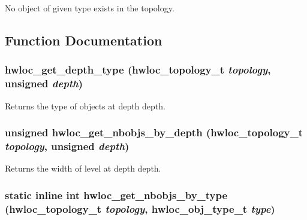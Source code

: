 No object of given type exists in the topology. 

\subsection{Function Documentation}
\hypertarget{group__hwlocality__information_ga8cc04ad9eb03b0b74d420adf8cc11ad2}{
\subsubsection[{hwloc\_\-get\_\-depth\_\-type}]{ hwloc\_\-get\_\-depth\_\-type ({\bf hwloc\_\-topology\_\-t} {\em topology}, \/  unsigned {\em depth})}}
\label{group__hwlocality__information_ga8cc04ad9eb03b0b74d420adf8cc11ad2}


Returns the type of objects at depth {\ttfamily depth}. \hypertarget{group__hwlocality__information_gab17065e3d53455973844568d9f21c72c}{
\subsubsection[{hwloc\_\-get\_\-nbobjs\_\-by\_\-depth}]{\setlength{\rightskip}{0pt plus 5cm}unsigned hwloc\_\-get\_\-nbobjs\_\-by\_\-depth ({\bf hwloc\_\-topology\_\-t} {\em topology}, \/  unsigned {\em depth})}}
\label{group__hwlocality__information_gab17065e3d53455973844568d9f21c72c}


Returns the width of level at depth {\ttfamily depth}. \hypertarget{group__hwlocality__information_gad86a90c0d3501d90410fb1a4eb36f5d0}{
\subsubsection[{hwloc\_\-get\_\-nbobjs\_\-by\_\-type}]{\setlength{\rightskip}{0pt plus 5cm}static inline int hwloc\_\-get\_\-nbobjs\_\-by\_\-type ({\bf hwloc\_\-topology\_\-t} {\em topology}, \/  {\bf hwloc\_\-obj\_\-type\_\-t} {\em type})}}
\label{group__hwlocality__information_gad86a90c0d3501d90410fb1a4eb36f5d0}


